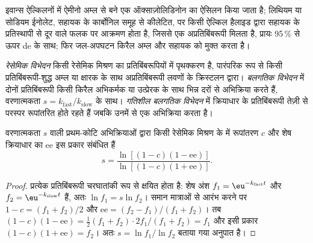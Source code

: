 इवान्स ऐल्किलनों में ऐमीनो अम्ल से बने एक ऑक्साज़ोलिडिनोन का ऐसिलन किया जाता है;
लिथियम या सोडियम ईनोलेट, सहायक के कार्बोनिल समूह से कीलेटित, पर
किसी ऐल्किल हैलाइड द्वारा सहायक के प्रतिस्थापी से दूर वाले फलक पर आक्रमण होता है,
जिससे एक अप्रतिबिंबरूपी मिलता है, प्रायः 95\,\% से ऊपर de के साथ; फिर जल-अपघटन
किरैल अम्ल और सहायक को मुक्त करता है।

\begin{definition}[विभेदन]\label{def:b3:asymmetric-synthesis:resolution}
\emph{रेसेमिक विभेदन} किसी रेसेमिक मिश्रण का
प्रतिबिंबरूपियों में पृथक्करण है, पारंपरिक रूप से किसी प्रतिबिंबरूपी-शुद्ध अम्ल या क्षारक के साथ
अप्रतिबिंबरूपी लवणों के क्रिस्टलन द्वारा। \emph{बलगतिक विभेदन}
में दोनों प्रतिबिंबरूपी किसी किरैल अभिकर्मक या
उत्प्रेरक के साथ भिन्न दरों से अभिक्रिया करते हैं, वरणात्मकता $s = k_{\mathrm{fast}}/k_{\mathrm{slow}}$ के साथ। \emph{गतिशील बलगतिक
विभेदन} में क्रियाधार के प्रतिबिंबरूपी
तेज़ी से परस्पर रूपांतरित होते रहते हैं जबकि उनमें से एक अभिक्रिया करता है।
\end{definition}

\begin{theorem}[कागान समीकरण]\label{thm:b3:asymmetric-synthesis:kagan}
वरणात्मकता $s$ वाली प्रथम-कोटि अभिक्रियाओं द्वारा किसी रेसेमिक मिश्रण के  में
रूपांतरण $c$ और शेष क्रियाधार का ee इस प्रकार संबंधित हैं
\[
  s = \frac{\ln[(1 - c)(1 - \mathrm{ee})]}{\ln[(1 - c)(1 + \mathrm{ee})]}.
\]
\end{theorem}

\begin{proof}
प्रत्येक प्रतिबिंबरूपी चरघातांकी रूप से क्षयित होता है: शेष अंश $f_1 = \eu^{-k_{\mathrm{fast}}t}$ और
$f_2 = \eu^{-k_{\mathrm{slow}}t}$ हैं, अतः $\ln f_1 = s\ln f_2$। समान मात्राओं से आरंभ करने पर $1 - c = (f_1 + f_2)/2$ और
$\mathrm{ee} = (f_2 - f_1)/(f_1 + f_2)$। तब $(1 - c)(1 - \mathrm{ee}) = \tfrac12(f_1 + f_2)\cdot 2f_1/(f_1 + f_2) = f_1$ और इसी प्रकार
$(1 - c)(1 + \mathrm{ee}) = f_2$। अतः $s = \ln f_1/\ln f_2$ बताया गया अनुपात है।
\end{proof}

